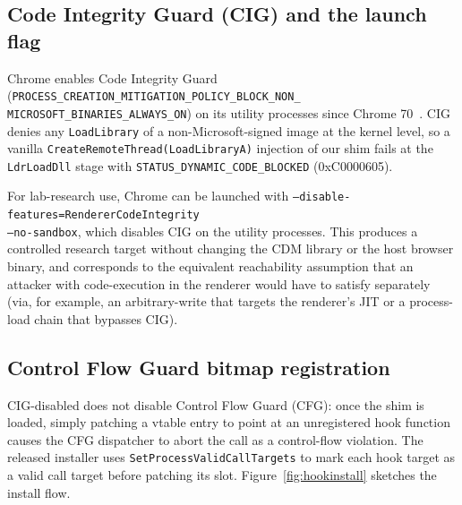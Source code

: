 \documentclass[11pt,letterpaper]{article}
\begin{document}
\subsection{Code Integrity Guard (CIG) and the launch flag}
\label{sec:runtime-cig}

Chrome enables Code Integrity Guard
(\texttt{PROCESS\_CREATION\_MITIGATION\_POLICY\_BLOCK\_NON\_\\MICROSOFT\_BINARIES\_ALWAYS\_ON})
on its utility processes since Chrome 70~\cite{chromium-cig}. CIG
denies any \texttt{LoadLibrary} of a non-Microsoft-signed image at
the kernel level, so a vanilla \texttt{CreateRemoteThread(LoadLibraryA)}
injection of our shim fails at the \texttt{LdrLoadDll} stage with
\texttt{STATUS\_DYNAMIC\_CODE\_BLOCKED} (0xC0000605).

For lab-research use, Chrome can be launched with
\texttt{--disable-features=RendererCodeIntegrity \\
        --no-sandbox}, which disables CIG on the utility processes.
This produces a controlled research target without changing the
CDM library or the host browser binary, and corresponds to the
equivalent reachability assumption that an attacker with
code-execution in the renderer would have to satisfy separately
(via, for example, an arbitrary-write that targets the renderer's
JIT or a process-load chain that bypasses CIG).

\subsection{Control Flow Guard bitmap registration}
\label{sec:runtime-cfg}

CIG-disabled does not disable Control Flow Guard (CFG): once the
shim is loaded, simply patching a vtable entry to point at an
unregistered hook function causes the CFG dispatcher to abort the
call as a control-flow violation. The released installer uses
\texttt{SetProcessValidCallTargets} to mark each hook target as a
valid call target before patching its slot. Figure~\ref{fig:hookinstall}
sketches the install flow.
\end{document}

